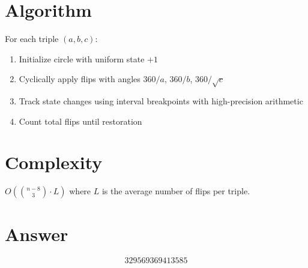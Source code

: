 \documentclass[12pt]{article}
\begin{document}
\section{Algorithm}
For each triple $(a,b,c)$:
\begin{enumerate}
    \item Initialize circle with uniform state $+1$
    \item Cyclically apply flips with angles $360/a$, $360/b$, $360/\sqrt{c}$
    \item Track state changes using interval breakpoints with high-precision arithmetic
    \item Count total flips until restoration
\end{enumerate}

\section{Complexity}
$O\!\left(\binom{n-8}{3} \cdot L\right)$ where $L$ is the average number of flips per triple.

\section{Answer}

\[
\boxed{329569369413585}
\]
\end{document}

